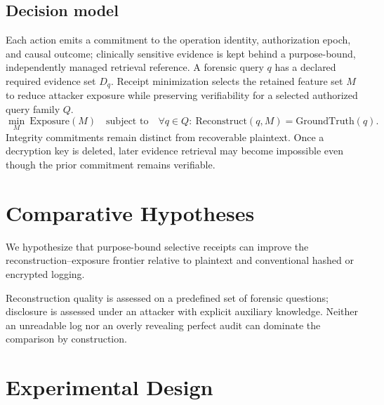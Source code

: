 \documentclass[11pt,a4paper]{article}
\begin{document}
\subsection{Decision model}
Each action emits a commitment to the operation identity, authorization epoch, and causal outcome; clinically sensitive evidence is kept behind a purpose-bound, independently managed retrieval reference. A forensic query $q$ has a declared required evidence set $D_q$. Receipt minimization selects the retained feature set $M$ to reduce attacker exposure while preserving verifiability for a selected authorized query family $Q$.
\begin{equation}
\min_M\ \mathrm{Exposure}(M)\quad
\text{subject to}\quad
\forall q\in Q:\ \mathrm{Reconstruct}(q,M)=\mathrm{GroundTruth}(q).
\end{equation}
Integrity commitments remain distinct from recoverable plaintext. Once a decryption key is deleted, later evidence retrieval may become impossible even though the prior commitment remains verifiable.

\section{Comparative Hypotheses}
We hypothesize that purpose-bound selective receipts can improve the reconstruction--exposure frontier relative to plaintext and conventional hashed or encrypted logging.

Reconstruction quality is assessed on a predefined set of forensic questions; disclosure is assessed under an attacker with explicit auxiliary knowledge. Neither an unreadable log nor an overly revealing perfect audit can dominate the comparison by construction.

\section{Experimental Design}
\end{document}
